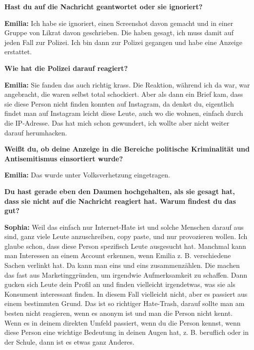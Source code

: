 \textbf{Hast du auf die Nachricht geantwortet oder sie ignoriert?}  

\textbf{Emilia:} Ich habe sie ignoriert, einen Screenshot davon gemacht und in einer Gruppe von Likrat davon geschrieben. Die haben gesagt, ich muss damit auf jeden Fall zur Polizei. Ich bin dann zur Polizei gegangen und habe eine Anzeige erstattet. 

\textbf{Wie hat die Polizei darauf reagiert?}  

\textbf{Emilia:} Sie fanden das auch richtig krass. Die Reaktion, während ich da war, war angebracht, die waren selbst total schockiert. Aber als dann ein Brief kam, dass sie diese Person nicht finden konnten auf Instagram, da denkst du, eigentlich findet man auf Instagram leicht diese Leute, auch wo die wohnen, einfach durch die IP-Adresse. Das hat mich schon gewundert, ich wollte aber nicht weiter darauf herumhacken. 

\textbf{Weißt du, ob deine Anzeige in die Bereiche politische Kriminalität und Antisemitismus einsortiert wurde?} 

\textbf{Emilia:} Das wurde unter Volksverhetzung eingetragen. 

\textbf{Du hast gerade eben den Daumen hochgehalten, als sie gesagt hat, dass sie nicht auf die Nachricht reagiert hat. Warum findest du das gut?} 

\textbf{Sophia:} Weil das einfach nur Internet-Hate ist und solche Menschen darauf aus sind, ganz viele Leute anzuschreiben, copy paste, und nur provozieren wollen. Ich glaube schon, dass diese Person spezifisch Leute ausgesucht hat. Manchmal kann man Interessen an einem Account erkennen, wenn Emilia z. B. verschiedene Sachen verlinkt hat. Da kann man eins und eins zusammenzählen. Die machen das fast aus Marketinggründen, um irgendwie Aufmerksamkeit zu schaffen. Dann gucken sich Leute dein Profil an und finden vielleicht irgendetwas, was sie als Konsument interessant finden. In diesem Fall vielleicht nicht, aber es passiert aus einem bestimmten Grund. Das ist so richtiger Hate-Trash, darauf sollte man am besten nicht reagieren, wenn es anonym ist und man die Person nicht kennt. Wenn es in deinem direkten Umfeld passiert, wenn du die Person kennst, wenn diese Person eine wichtige Bedeutung in deinen Augen hat, z. B. beruflich oder in der Schule, dann ist es etwas ganz Anderes. 

